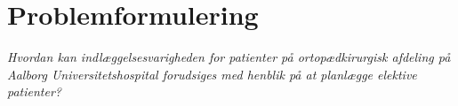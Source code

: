 \section{Problemformulering}
\textit{Hvordan kan indlæggelsesvarigheden for patienter på ortopædkirurgisk afdeling på Aalborg Universitetshospital forudsiges med henblik på at planlægge elektive patienter?}